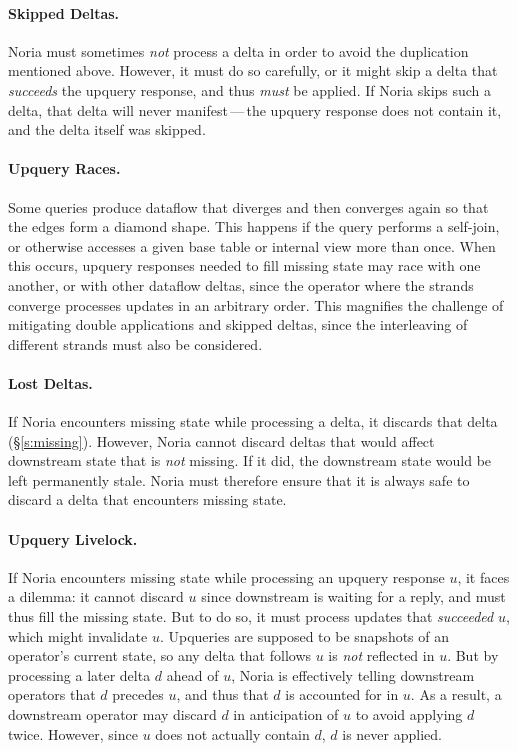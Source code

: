 \paragraph{Skipped Deltas.}
Noria must sometimes \emph{not} process a delta in order to avoid the
duplication mentioned above. However, it must do so carefully, or it might skip
a delta that \emph{succeeds} the upquery response, and thus \emph{must} be
applied. If Noria skips such a delta, that delta will never manifest\,---\,the
upquery response does not contain it, and the delta itself was skipped.

\paragraph{Upquery Races.}
Some queries produce dataflow that diverges and then converges again so that the
edges form a diamond shape. This happens if the query performs a self-join, or
otherwise accesses a given base table or internal view more than once. When
this occurs, upquery responses needed to fill missing state may race with one
another, or with other dataflow deltas, since the operator where the strands
converge processes updates in an arbitrary order. This magnifies the challenge
of mitigating double applications and skipped deltas, since the interleaving of
different strands must also be considered.

\paragraph{Lost Deltas.}
If Noria encounters missing state while processing a delta, it discards that
delta (\S\ref{s:missing}). However, Noria cannot discard deltas that would
affect downstream state that is \emph{not} missing. If it did, the downstream
state would be left permanently stale. Noria must therefore ensure that it is
always safe to discard a delta that encounters missing state.

\paragraph{Upquery Livelock.}
If Noria encounters missing state while processing an upquery response $u$, it
faces a dilemma: it cannot discard $u$ since downstream is waiting for a reply,
and must thus fill the missing state. But to do so, it must process updates that
\emph{succeeded} $u$, which might invalidate $u$. Upqueries are supposed to be
snapshots of an operator's current state, so any delta that follows $u$ is
\emph{not} reflected in $u$. But by processing a later delta $d$ ahead of $u$,
Noria is effectively telling downstream operators that $d$ precedes $u$, and
thus that $d$ is accounted for in $u$. As a result, a downstream operator may
discard $d$ in anticipation of $u$ to avoid applying $d$ twice. However, since
$u$ does not actually contain $d$, $d$ is never applied.

